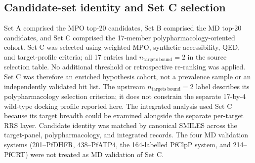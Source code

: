 \documentclass[journal=jcisd8,manuscript=article]{achemso}
\begin{document}
\subsection{Candidate-set identity and Set C selection}\label{sec:methods_cohort}
Set A comprised the MPO top-20 candidates, Set B comprised the MD top-20 candidates, and Set C comprised the 17-member polypharmacology-oriented cohort. Set C was selected using weighted MPO, synthetic accessibility, QED, and target-profile criteria; all 17 entries had $n_{\mathrm{targets\ bound}}=2$ in the source selection table. No additional threshold or retrospective re-ranking was applied. Set C was therefore an enriched hypothesis cohort, not a prevalence sample or an independently validated hit list. The upstream $n_{\mathrm{targets\ bound}}=2$ label describes its polypharmacology selection criterion; it does not constrain the separate 17-by-4 wild-type docking profile reported here. The integrated analysis used Set C because its target breadth could be examined alongside the separate per-target RRS layer. Candidate identity was matched by canonical SMILES across the target-panel, polypharmacology, and integrated records. The four MD validation systems (201--PfDHFR, 438--PfATP4, the 164-labelled PfClpP system, and 214--PfCRT) were not treated as MD validation of Set C.
\end{document}
